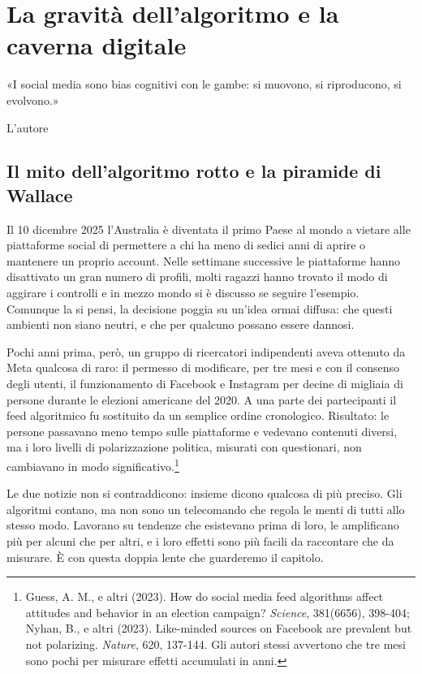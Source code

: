 \chapter{La gravità dell'algoritmo e la caverna digitale}
\label{cap:p2c11}

\epigraph{«I social media sono bias cognitivi con le gambe: si muovono, si riproducono, si evolvono.»}{L'autore}

\section{Il mito dell'algoritmo rotto e la piramide di Wallace}

Il 10 dicembre 2025 l'Australia è diventata il primo Paese al mondo a vietare alle piattaforme social di permettere a chi ha meno di sedici anni di aprire o mantenere un proprio account. Nelle settimane successive le piattaforme hanno disattivato un gran numero di profili, molti ragazzi hanno trovato il modo di aggirare i controlli e in mezzo mondo si è discusso se seguire l'esempio. Comunque la si pensi, la decisione poggia su un'idea ormai diffusa: che questi ambienti non siano neutri, e che per qualcuno possano essere dannosi.

Pochi anni prima, però, un gruppo di ricercatori indipendenti aveva ottenuto da Meta qualcosa di raro: il permesso di modificare, per tre mesi e con il consenso degli utenti, il funzionamento di Facebook e Instagram per decine di migliaia di persone durante le elezioni americane del 2020. A una parte dei partecipanti il feed algoritmico fu sostituito da un semplice ordine cronologico. Risultato: le persone passavano meno tempo sulle piattaforme e vedevano contenuti diversi, ma i loro livelli di polarizzazione politica, misurati con questionari, non cambiavano in modo significativo.\footnote{Guess, A. M., e altri (2023). How do social media feed algorithms affect attitudes and behavior in an election campaign? \textit{Science}, 381(6656), 398-404; Nyhan, B., e altri (2023). Like-minded sources on Facebook are prevalent but not polarizing. \textit{Nature}, 620, 137-144. Gli autori stessi avvertono che tre mesi sono pochi per misurare effetti accumulati in anni.}

Le due notizie non si contraddicono: insieme dicono qualcosa di più preciso. Gli algoritmi contano, ma non sono un telecomando che regola le menti di tutti allo stesso modo. Lavorano su tendenze che esistevano prima di loro, le amplificano più per alcuni che per altri, e i loro effetti sono più facili da raccontare che da misurare. È con questa doppia lente che guarderemo il capitolo.

